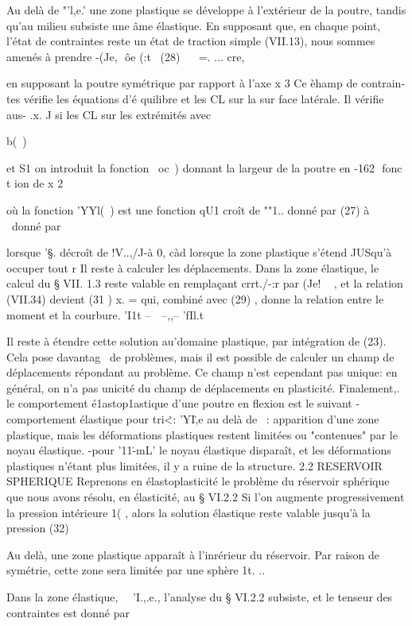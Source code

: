 {{{{{{{{{{{{{{{{{{Au delà de "'l,e.' une zone plastique se développe à l'extérieur de la poutre, tandis qu'au milieu subsiste une âme élastique. En supposant que, en chaque 
point, l'état de contraintes reste un état de traction simple (VII.13), nous 
sommes amenés à prendre 
-(Je, 
 ôe (:t~
(28) 
~~ =. 
} 
... cre, 

en supposant la poutre symétrique par rapport à l'axe x
3 Ce èhamp de contrain­
tes vérifie les équations d'é­
quilibre et les CL 	sur la sur­
face latérale. Il vérifie aus-	.x. 
J 
si les CL sur les extrémités 
avec 


b(~) 

et S1 on introduit la fonction ~oc~) donnant la largeur de la poutre en 
-162 ­
fonc t ion de x
2 

où la fonction 'YYl(~) est une fonction qU1 croît de ""1.. donné par (27) à ~donné par 

lorsque '§. décroît de !V..,/J-à 0, càd lorsque la zone plastique s'étend JUS­qu'à occuper tout r 
Il reste à calculer les déplacements. Dans la zone élastique, le calcul du § VII. 1.3 reste valable en remplaçant crrt./-:r par (Je! ~ , et la re­lation (VII.34) devient 
(31 ) 
x. = 
qui, combiné avec (29) , donne la relation entre le moment et la courbure. 
'I1t --~~--,,--­
'fIl.t 


Il reste à étendre cette solution au'domaine plastique, par inté­gration de (23). Cela pose davantag~ de problèmes, mais il est possible de calculer un champ de déplacements répondant au problème. Ce champ n'est ce­pendant pas unique: en général, on n'a pas unicité du champ de déplacements en plasticité. 
Finalement,. le comportement é1astop1astique d'une poutre en flexion 
est le suivant 
-comportement élastique pour tri\. <: 'YI\.,e au delà de ~: apparition d'une zone plastique, mais les déformations plastiques restent limitées ou "contenues" par le noyau élastique. 
-pour '11\.-mL' le noyau élastique disparaît, et les déformations plas­tiques n'étant plus limitées, il y a ruine de la structure. 
2.2 RESERVOIR SPHERIQUE 
Reprenons en élastoplasticité le problème du réservoir sphérique que nous avons résolu, en élasticité, au § VI.2.2 Si l'on augmente pro­gressivement la pression intérieure 1( , alors la solution élastique reste valable jusqu'à la pression 
(32) 

Au delà, une zone plastique apparaît à l'inrérieur du réservoir. Par raison 
de symétrie, cette zone sera 
limitée par une sphère 1t. .. ~ 

Dans la zone élastique, ~~'I.,.e., l'analyse du § VI.2.2 subsiste, et le ten­seur des contraintes est donné par 


}}}}}}}}}}}}}}}}}
